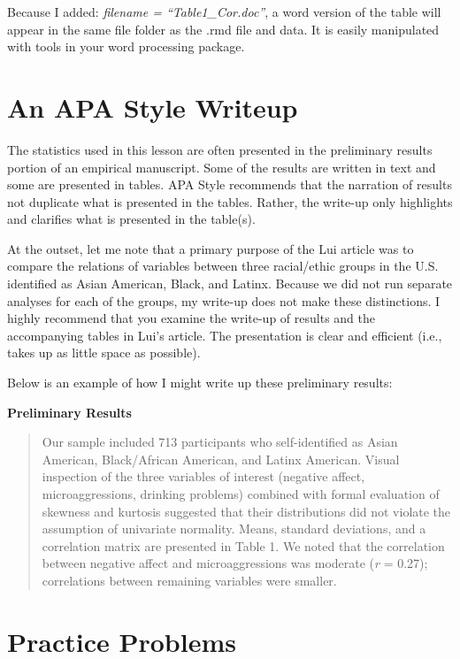 \documentclass[
  11pt,
]{book}
\begin{document}
Because I added: \emph{filename = ``Table1\_Cor.doc''}, a word version of the table will appear in the same file folder as the .rmd file and data. It is easily manipulated with tools in your word processing package.

\hypertarget{an-apa-style-writeup}{%
\section{An APA Style Writeup}\label{an-apa-style-writeup}}

The statistics used in this lesson are often presented in the preliminary results portion of an empirical manuscript. Some of the results are written in text and some are presented in tables. APA Style recommends that the narration of results not duplicate what is presented in the tables. Rather, the write-up only highlights and clarifies what is presented in the table(s).

At the outset, let me note that a primary purpose of the Lui \citeyearpar{lui_racial_2020} article was to compare the relations of variables between three racial/ethic groups in the U.S. identified as Asian American, Black, and Latinx. Because we did not run separate analyses for each of the groups, my write-up does not make these distinctions. I highly recommend that you examine the write-up of results and the accompanying tables in Lui's article. The presentation is clear and efficient (i.e., takes up as little space as possible).

Below is an example of how I might write up these preliminary results:

\textbf{Preliminary Results}

\begin{quote}
Our sample included 713 participants who self-identified as Asian American, Black/African American, and Latinx American. Visual inspection of the three variables of interest (negative affect, microaggressions, drinking problems) combined with formal evaluation of skewness and kurtosis suggested that their distributions did not violate the assumption of univariate normality. Means, standard deviations, and a correlation matrix are presented in Table 1. We noted that the correlation between negative affect and microaggressions was moderate (\emph{r} = 0.27); correlations between remaining variables were smaller.
\end{quote}

\hypertarget{practice-problems-1}{%
\section{Practice Problems}\label{practice-problems-1}}
\end{document}
